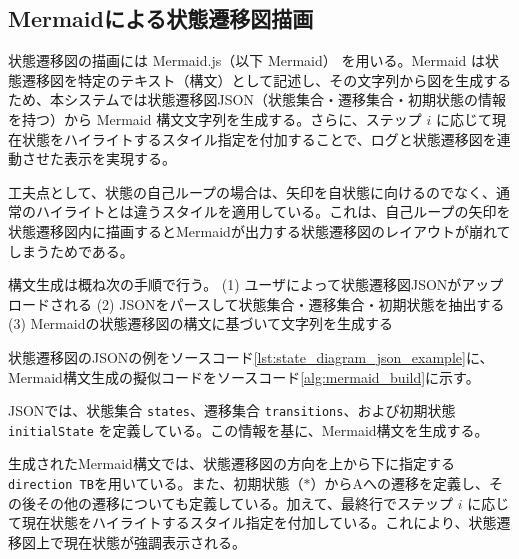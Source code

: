 \documentclass[12pt]{jreport}
\begin{document}


\subsection{Mermaidによる状態遷移図描画}
\label{sec:mermaid_build}
\begin{par}
状態遷移図の描画には Mermaid.js（以下 Mermaid） を用いる。Mermaid は状態遷移図を特定のテキスト（構文）として記述し、その文字列から図を生成するため、本システムでは状態遷移図JSON（状態集合・遷移集合・初期状態の情報を持つ）から Mermaid 構文文字列を生成する。さらに、ステップ $i$ に応じて現在状態をハイライトするスタイル指定を付加することで、ログと状態遷移図を連動させた表示を実現する。
\end{par}
\begin{par}
工夫点として、状態の自己ループの場合は、矢印を自状態に向けるのでなく、通常のハイライトとは違うスタイルを適用している。これは、自己ループの矢印を状態遷移図内に描画するとMermaidが出力する状態遷移図のレイアウトが崩れてしまうためである。
\end{par}

\begin{par}
構文生成は概ね次の手順で行う。
(1) ユーザによって状態遷移図JSONがアップロードされる
(2) JSONをパースして状態集合・遷移集合・初期状態を抽出する
(3) Mermaidの状態遷移図の構文に基づいて文字列を生成する
\end{par}

\begin{par}
  状態遷移図のJSONの例をソースコード\ref{lst:state_diagram_json_example}に、Mermaid構文生成の擬似コードをソースコード\ref{alg:mermaid_build}に示す。
\end{par}
\begin{par}
  JSONでは、状態集合 \texttt{states}、遷移集合 \texttt{transitions}、および初期状態 \texttt{initialState} を定義している。この情報を基に、Mermaid構文を生成する。
\end{par}
\begin{par}
  生成されたMermaid構文では、状態遷移図の方向を上から下に指定する\texttt{direction TB}を用いている。また、初期状態（$*$）からAへの遷移を定義し、その後その他の遷移についても定義している。加えて、最終行でステップ $i$ に応じて現在状態をハイライトするスタイル指定を付加している。これにより、状態遷移図上で現在状態が強調表示される。
\end{par}
\end{document}
